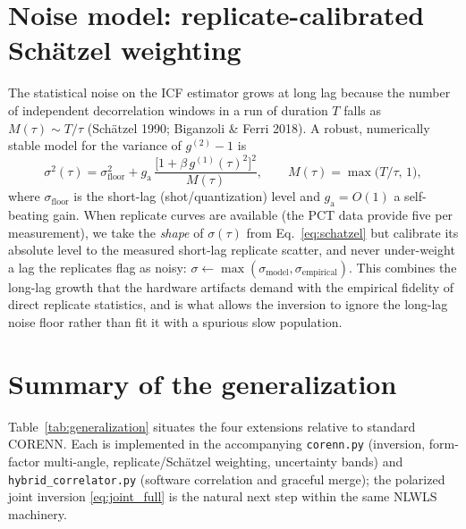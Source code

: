 \documentclass[11pt]{article}
\newcommand{\g}[1]{g^{(#1)}}
\begin{document}
\section{Noise model: replicate-calibrated Schätzel weighting}
\label{sec:noise}
The statistical noise on the ICF estimator grows at long lag because the number
of independent decorrelation windows in a run of duration $T$ falls as
$M(\tau)\sim T/\tau$ (Schätzel 1990; Biganzoli \& Ferri 2018). A robust,
numerically stable model for the variance of $\g2-1$ is
\begin{equation}\label{eq:schatzel}
  \sigma^2(\tau) = \sigma_{\mathrm{floor}}^2
  + g_{\mathrm a}\,\frac{\bigl[1+\beta\,\g1(\tau)^2\bigr]^2}{M(\tau)},
  \qquad M(\tau)=\max\!\bigl(T/\tau,\,1\bigr),
\end{equation}
where $\sigma_{\mathrm{floor}}$ is the short-lag (shot/quantization) level and
$g_{\mathrm a}=O(1)$ a self-beating gain. When replicate curves are available
(the PCT data provide five per measurement), we take the \emph{shape} of
$\sigma(\tau)$ from Eq.~\eqref{eq:schatzel} but calibrate its absolute level to
the measured short-lag replicate scatter, and never under-weight a lag the
replicates flag as noisy: $\sigma \leftarrow \max(\sigma_{\text{model}},
\sigma_{\text{empirical}})$. This combines the long-lag growth that the
hardware artifacts demand with the empirical fidelity of direct replicate
statistics, and is what allows the inversion to ignore the long-lag noise floor
rather than fit it with a spurious slow population.

\section{Summary of the generalization}
Table~\ref{tab:generalization} situates the four extensions relative to standard
CORENN. Each is implemented in the accompanying \texttt{corenn.py} (inversion,
form-factor multi-angle, replicate/Schätzel weighting, uncertainty bands) and
\texttt{hybrid\_correlator.py} (software correlation and graceful merge); the
polarized joint inversion \eqref{eq:joint_full} is the natural next step within
the same NLWLS machinery.
\end{document}
